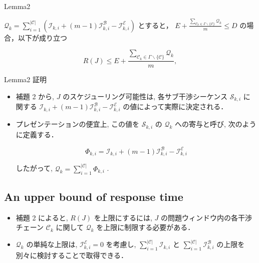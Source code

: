 \begin{frame}{Lemma2}
    \begin{lemma}[]
        $\mathcal{Q}_{k}=\sum_{i=1}^{|\mathcal{C}|}\left(\mathcal{I}_{k, i}+(m-1) \mathcal{I}_{k, i}^{\mathcal{B}}-\mathcal{I}_{k, i}^{\mathcal{E}}\right)$ とすると，
        $E+\frac{\sum_{\mathcal{C}_{k} \in \Gamma \backslash\{\mathcal{C}\}} \mathcal{Q}_{k}}{m} \leq D$ の場合，以下が成り立つ

        \begin{equation*}
            R(J) \leq E+\frac{\sum_{\mathcal{C}_{k} \in \Gamma \backslash\{\mathcal{C}\}} \mathcal{Q}_{k}}{m},
        \end{equation*}
    \end{lemma}
\end{frame}

\begin{frame}{Lemma2 証明}
    \todo{}
\end{frame}

\begin{frame}{}
    \begin{itemize}
        \item 補題 2 から, $J$ のスケジューリング可能性は, 各サブ干渉シーケンス $\mathcal{S}_{k, i}$ に関する $\mathcal{I}_{k, i}+(m-1) \mathcal{I}_{k, i}^{\mathcal{B}}-\mathcal{I}_{k, i}^{\mathcal{E}}$ の値によって実際に決定される．
        \item プレゼンテーションの便宜上, この値を $\mathcal{S}_{k, i}$ の $\mathcal{Q}_{k}$ への寄与と呼び, 次のように定義する．

              \begin{equation*}
                  \Phi_{k, i}=\mathcal{I}_{k, i}+(m-1) \mathcal{I}_{k, i}^{\mathcal{B}}-\mathcal{I}_{k, i}^{\mathcal{E}}
              \end{equation*}

              したがって, $\mathcal{Q}_{k}=\sum_{i=1}^{|\mathcal{C}|} \Phi_{k, i}$ .
    \end{itemize}
\end{frame}


\subsection{An upper bound of response time}
\label{ssec: an_upper_bound_of_response_time}

\begin{frame}{}
\begin{itemize}
    \item 補題 2 によると, $R(J)$ を上限にするには, $J$ の問題ウィンドウ内の各干渉チェーン $\mathcal{C}_{k}$ に関して $\mathcal{Q}_{k}$ を上限に制限する必要がある．
    \item $\mathcal{Q}_{k}$ の単純な上限は, $\mathcal{I}_{k, i}^{\mathcal{E}}=0$ を考慮し, $\sum_{i=1}^{|\mathcal{C}|} \mathcal{I}_{k, i}$ と $\sum_{i=1}^{|\mathcal{C}|} \mathcal{I}_{k, i}^{\mathcal{B}}$ の上限を別々に検討することで取得できる．
\end{itemize}
\end{frame}

\todo{}

